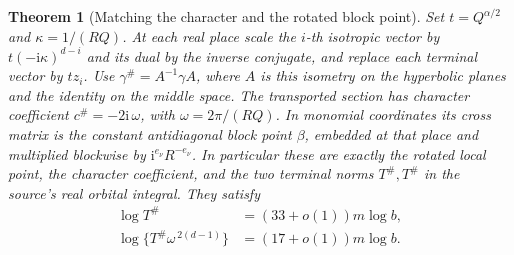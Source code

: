 \documentclass[a4paper,11pt]{article}
\newtheorem{theorem}[proposition]{Theorem}
\theoremstyle{definition}
\theoremstyle{remark}
\numberwithin{equation}{section}
\begin{document}
\begin{theorem}[Matching the character and the rotated block point]
\label{thm:match209}
Set \(t=Q^{\alpha/2}\) and \(\kappa=1/(RQ)\). At each real
place scale the \(i\)-th isotropic vector by
\(t(-\mathrm i\kappa)^{d-i}\) and its dual by the inverse
conjugate, and replace each terminal vector by \(tz_i\).
Use \(\gamma^\#=A^{-1}\gamma A\), where \(A\) is this isometry
on the hyperbolic planes and the identity on the middle space.
The transported section has character coefficient
\(c^\#=-2\mathrm i\,\omega\), with \(\omega=2\pi/(RQ)\).
In monomial coordinates its cross matrix is the constant
antidiagonal block point \(\beta\), embedded at that place and
multiplied blockwise by \(\mathrm i^{e_\nu}R^{-e_\nu}\).
In particular these are exactly the rotated local point, the
character coefficient, and the two terminal norms \(T^\#,T^\#\)
in the source's real orbital integral. They satisfy
\begin{align*}
      \log T^\#&=(33+o(1))m\log b,\\
      \log\{T^\#\omega^{\,2(d-1)}\}&=(17+o(1))m\log b .
\end{align*}
\end{theorem}
\end{document}
